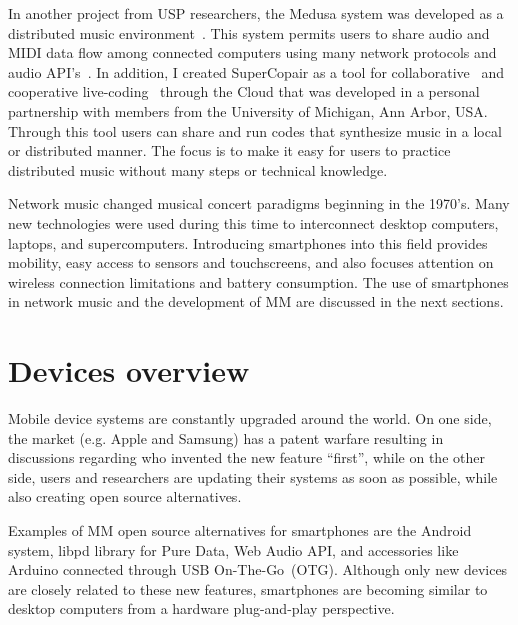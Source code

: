 In another project from USP researchers, the Medusa system was developed as a distributed music environment~\citep{Schiavoni2011medusa,Schiavoni2012network,Schiavoni2013network}.
This system permits users to share audio and MIDI data flow among connected computers using many network protocols and audio API's~\citep{Schiavoni2013thesis}.
In addition, I created SuperCopair as a tool for collaborative~\citep{deCarvalhoJunior2015supercopair} and cooperative live-coding~\citep{deCarvalhoJunior2015cooperative} through the Cloud that was developed in a personal partnership with members from the University of Michigan, Ann Arbor, USA.
Through this tool users can share and run codes that synthesize music in a local or distributed manner.
The focus is to make it easy for users to practice distributed music without many steps or technical knowledge.

Network music changed musical concert paradigms beginning in the 1970's.
Many new technologies were used during this time to interconnect desktop computers, laptops, and supercomputers.
Introducing smartphones into this field provides mobility, easy access to sensors and touchscreens, and also focuses attention on wireless connection limitations and battery consumption.
The use of smartphones in network music and the development of MM are discussed in the next sections.

\section{Devices overview}
\label{sec:mobiletechnologies}

Mobile device systems are constantly upgraded around the world.
On one side, the market (e.g. Apple and Samsung) has a patent warfare resulting in discussions regarding who invented the new feature ``first'', while on the other side, users and researchers are updating their systems as soon as possible, while also creating open source alternatives.

Examples of MM open source alternatives for smartphones are the Android system, libpd library for Pure Data, Web Audio API, and accessories like Arduino connected through USB On-The-Go~(OTG).
Although only new devices are closely related to these new features, smartphones are becoming similar to desktop computers from a hardware plug-and-play perspective.

